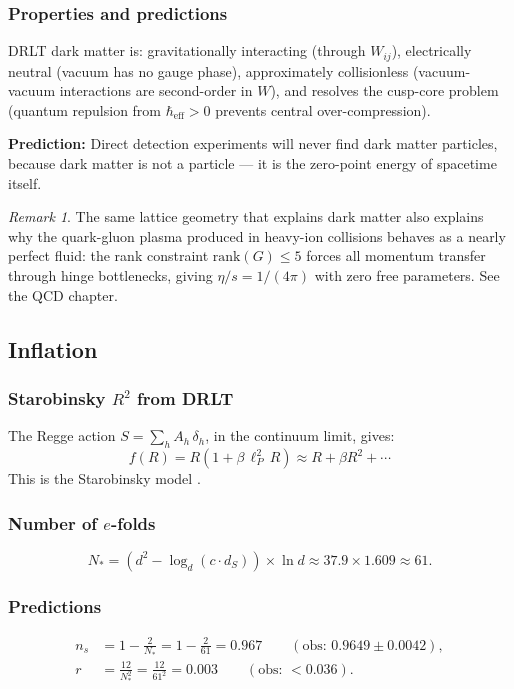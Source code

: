\documentclass[12pt]{article}
\theoremstyle{remark}
\newtheorem{remark}[theorem]{Remark}
\theoremstyle{definition}
\begin{document}
\subsubsection{Properties and predictions}

DRLT dark matter is: gravitationally interacting (through $W_{ij}$), electrically neutral (vacuum has no gauge phase), approximately collisionless (vacuum-vacuum interactions are second-order in $W$), and resolves the cusp-core problem (quantum repulsion from $\hbar_\text{eff} > 0$ prevents central over-compression).

\textbf{Prediction:} Direct detection experiments will never find dark matter particles, because dark matter is not a particle --- it is the zero-point energy of spacetime itself.

\begin{remark}
The same lattice geometry that explains dark matter also explains why the quark-gluon plasma produced in heavy-ion collisions behaves as a nearly perfect fluid: the rank constraint $\text{rank}(G) \leq 5$ forces all momentum transfer through hinge bottlenecks, giving $\eta/s = 1/(4\pi)$ with zero free parameters. See the QCD chapter.
\end{remark}

\subsection{Inflation}

\subsubsection{Starobinsky $R^2$ from DRLT}

The Regge action $S = \sum_h A_h\,\delta_h$, in the continuum limit, gives:
\begin{equation}
f(R) = R(1 + \beta\,\ell_P^2\,R) \approx R + \beta R^2 + \cdots
\end{equation}
This is the Starobinsky model \cite{Starobinsky}.

\subsubsection{Number of $e$-folds}

\begin{equation}
N_* = (d^2 - \log_d(c \cdot d_S)) \times \ln d \approx 37.9 \times 1.609 \approx 61.
\end{equation}

\subsubsection{Predictions}
\begin{align}
n_s &= 1 - \frac{2}{N_*} = 1 - \frac{2}{61} = 0.967 \qquad (\text{obs: } 0.9649 \pm 0.0042), \\
r &= \frac{12}{N_*^2} = \frac{12}{61^2} = 0.003 \qquad (\text{obs: } < 0.036).
\end{align}
\end{document}
